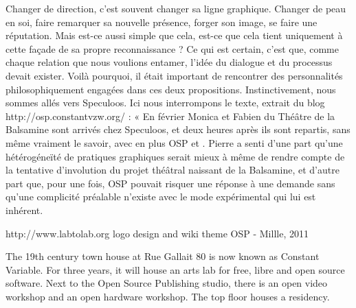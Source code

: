 \subject{Visual identity for the Balsamine theatre.}


Changer de direction, c'est souvent changer sa ligne graphique. Changer
de peau en soi, faire remarquer sa nouvelle présence, forger son image,
se faire une réputation. Mais est-ce aussi simple que cela, est-ce que
cela tient uniquement à cette façade de sa propre reconnaissance ? Ce
qui est certain, c'est que, comme chaque relation que nous voulions
entamer, l'idée du dialogue et du processus devait exister. Voilà
pourquoi, il était important de rencontrer des personnalités
philosophiquement engagées dans ces deux propositions. Instinctivement,
nous sommes allés vers Speculoos. Ici nous interrompons le texte,
extrait du blog http://osp.constantvzw.org/ : « En février Monica et
Fabien du Théâtre de la Balsamine sont arrivés chez Speculoos, et deux
heures après ils sont repartis, sans même vraiment le savoir, avec en
plus OSP et . Pierre a senti d'une part qu'une hétérogéneïté de
pratiques graphiques serait mieux à même de rendre compte de la
tentative d'involution du projet théâtral naissant de la Balsamine, et
d'autre part que, pour une fois, OSP pouvait risquer une réponse à une
demande sans qu'une complicité préalable n'existe avec le mode
expérimental qui lui est inhérent.

{}
{}
{}
{}




\subject{LABtoLAB}


http://www.labtolab.org logo design and wiki theme OSP - Millle, 2011

{} {}
{}




\subject{Constant Variable}


The 19th century town house at Rue Gallait 80 is now known as Constant
Variable. For three years, it will house an arts lab for free, libre and
open source software. Next to the Open Source Publishing studio, there
is an open video workshop and an open hardware workshop. The top floor
houses a residency.

